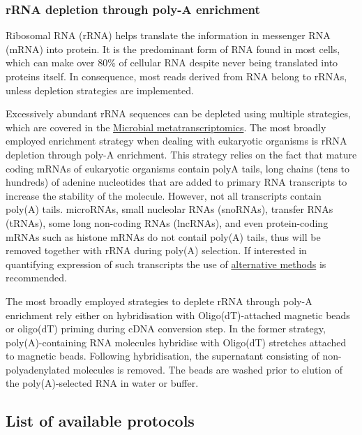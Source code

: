 \documentclass[
]{book}
\begin{document}
\hypertarget{rrna-depletion-polya}{%
\subsubsection*{rRNA depletion through poly-A enrichment}\label{rrna-depletion-polya}}

Ribosomal RNA (rRNA) helps translate the information in messenger RNA (mRNA) into protein. It is the predominant form of RNA found in most cells, which can make over 80\% of cellular RNA despite never being translated into proteins itself. In consequence, most reads derived from RNA belong to rRNAs, unless depletion strategies are implemented.

Excessively abundant rRNA sequences can be depleted using multiple strategies, which are covered in the \protect\hyperlink{library-microbial-metatranscriptomics}{Microbial metatranscriptomics}. The most broadly employed enrichment strategy when dealing with eukaryotic organisms is rRNA depletion through poly-A enrichment. This strategy relies on the fact that mature coding mRNAs of eukaryotic organisms contain polyA tails, long chains (tens to hundreds) of adenine nucleotides that are added to primary RNA transcripts to increase the stability of the molecule. However, not all transcripts contain poly(A) tails. microRNAs, small nucleolar RNAs (snoRNAs), transfer RNAs (tRNAs), some long non-coding RNAs (lncRNAs), and even protein-coding mRNAs such as histone mRNAs do not contail poly(A) tails, thus will be removed together with rRNA during poly(A) selection. If interested in quantifying expression of such transcripts the use of \protect\hyperlink{library-microbial-metatranscriptomics}{alternative methods} is recommended.

The most broadly employed strategies to deplete rRNA through poly-A enrichment rely either on hybridisation with Oligo(dT)-attached magnetic beads or oligo(dT) priming during cDNA conversion step. In the former strategy, poly(A)-containing RNA molecules hybridise with Oligo(dT) stretches attached to magnetic beads. Following hybridisation, the supernatant consisting of non-polyadenylated molecules is removed. The beads are washed prior to elution of the poly(A)-selected RNA in water or buffer.

\hypertarget{rrna-polya-depletion-protocols}{%
\subsection*{List of available protocols}\label{rrna-polya-depletion-protocols}}
\end{document}
